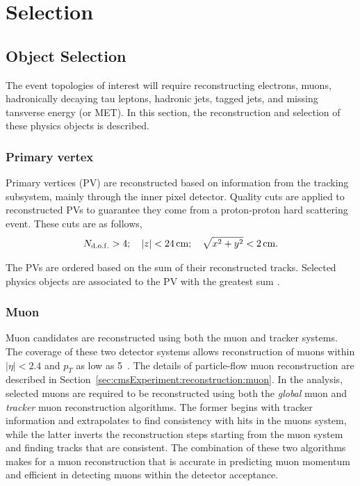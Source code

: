 \section{Selection}
\label{sec:analysis:selection}



\subsection{Object Selection}
\label{sec:analysis:selection:object}

The event topologies of interest will require reconstructing electrons, muons, hadronically decaying tau leptons, hadronic jets, \PQb tagged jets, and missing tansverse energy (\MET or MET).  In this section, the reconstruction and selection of these physics objects is described.



\subsubsection{Primary vertex}
Primary vertices (PV) are reconstructed based on information from the tracking subsystem, mainly through the inner pixel detector. Quality cuts are applied to reconstructed PVs to guarantee they come from a proton-proton hard scattering event. These cuts are as follows,
\begin{equation*}
    N_{\rm d.o.f.}> 4; \quad  \left|z\right| < 24\,\text{cm}; \quad \sqrt{x^{2} + y^{2}} < 2\,\text{cm}.
\end{equation*}


\noindent The PVs are ordered based on the sum \pt of their reconstructed tracks. Selected physics objects are associated to the PV with the greatest sum \pt. 




\subsubsection{Muon}
Muon candidates are reconstructed using both the muon and tracker systems. The coverage of these two detector systems allows reconstruction of muons within $\left|\eta\right| < 2.4$ and $p_{T}$ as low as 5\GeV~\cite{Chatrchyan:2012xi}. The details of particle-flow muon reconstruction are described in Section~\ref{sec:cmsExperiment:reconstruction:muon}. In the analysis, selected muons are required to be reconstructed using both the \emph{global} muon and \emph{tracker} muon reconstruction algorithms. The former begins with tracker information and extrapolates to find consistency with hits in the muons system, while the latter inverts the reconstruction steps starting from the muon system and finding tracks that are consistent. The combination of these two algorithms makes for a muon reconstruction that is accurate in predicting muon momentum and efficient in detecting muons within the detector acceptance.

